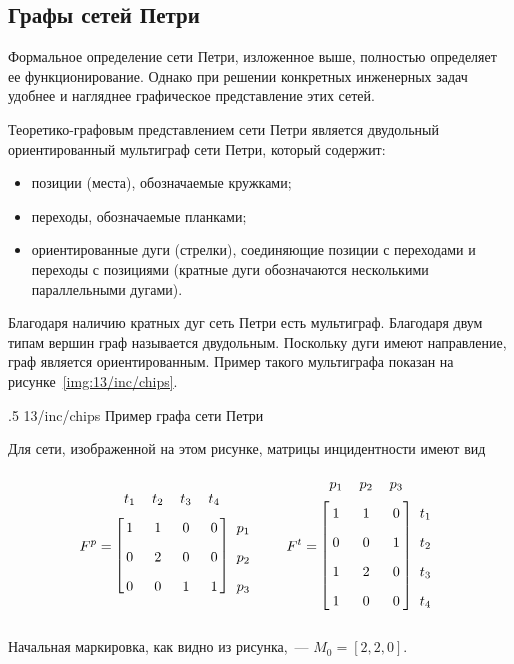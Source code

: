 \subsection{Графы сетей Петри}

Формальное определение сети Петри, изложенное выше, полностью определяет ее функционирование. Однако при решении конкретных инженерных задач удобнее и нагляднее графическое представление этих сетей.

Теоретико-графовым представлением сети Петри является двудольный ориентированный мультиграф сети Петри, который содержит:

\begin{itemize}
    \item позиции (места), обозначаемые кружками;
    \item переходы, обозначаемые планками;
    \item ориентированные дуги (стрелки), соединяющие позиции с переходами и переходы с позициями (кратные дуги обозначаются несколькими параллельными дугами).
\end{itemize}

Благодаря наличию кратных дуг сеть Петри есть мультиграф. Благодаря двум типам вершин граф называется двудольным. Поскольку дуги имеют направление, граф является ориентированным. Пример такого мультиграфа показан на рисунке~\ref{img:13/inc/chips}.

\image
{.5\textwidth}
{13/inc/chips}
{Пример графа сети Петри}

Для сети, изображенной на этом рисунке, матрицы инцидентности имеют вид
%
\begin{equation*}
    \renewcommand*{\arraystretch}{1.75}
    F^p = \begin{blockarray}{ccccc}
        t_1 & t_2 & t_3 & t_4 & \\
        \begin{block}{[cccc]c}
            1 & 1 & 0 & 0 & p_1\\
            0 & 2 & 0 & 0 & p_2\\
            0 & 0 & 1 & 1 & p_3\\
        \end{block}
    \end{blockarray}
    \quad\quad
    F^t = \begin{blockarray}{cccc}
        p_1 & p_2 & p_3 & \\
        \begin{block}{[ccc]c}
            1 & 1 & 0 & t_1\\
            0 & 0 & 1 & t_2\\
            1 & 2 & 0 & t_3\\
            1 & 0 & 0 & t_4\\
        \end{block}
    \end{blockarray}
\end{equation*}
%
Начальная маркировка, как видно из рисунка,~--- ${M_0 = [2, 2, 0]}$.

